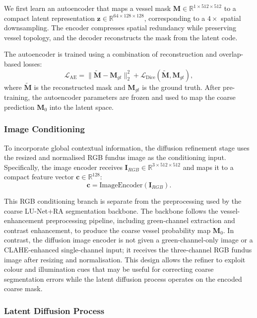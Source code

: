 \documentclass[journal,article,submit,pdftex,moreauthors]{Definitions/mdpi}
\begin{document}
We first learn an autoencoder that maps a vessel mask $\mathbf{M}\in\mathbb{R}^{1\times512\times512}$ to a compact latent representation $\mathbf{z}\in\mathbb{R}^{64\times128\times128}$, corresponding to a $4\times$ spatial downsampling. The encoder compresses spatial redundancy while preserving vessel topology, and the decoder reconstructs the mask from the latent code.

The autoencoder is trained using a combination of reconstruction and overlap-based losses:
\begin{equation}
\mathcal{L}_{\text{AE}} =
\|\tilde{\mathbf{M}}-\mathbf{M}_{gt}\|_2^2 +
\mathcal{L}_{\text{Dice}}(\tilde{\mathbf{M}},\mathbf{M}_{gt}),
\end{equation}
where $\tilde{\mathbf{M}}$ is the reconstructed mask and $\mathbf{M}_{gt}$ is the ground truth. After pre-training, the autoencoder parameters are frozen and used to map the coarse prediction $\mathbf{M}_0$ into the latent space.

\subsubsection{Image Conditioning}

To incorporate global contextual information, the diffusion refinement stage uses the resized and normalised RGB fundus image as the conditioning input. Specifically, the image encoder receives $\mathbf{I}_{RGB}\in\mathbb{R}^{3\times512\times512}$ and maps it to a compact feature vector $\mathbf{c}\in\mathbb{R}^{128}$:
\begin{equation}
\mathbf{c}=\mathrm{ImageEncoder}(\mathbf{I}_{RGB}).
\end{equation}

This RGB conditioning branch is separate from the preprocessing used by the coarse LU-Net+RA segmentation backbone. The backbone follows the vessel-enhancement preprocessing pipeline, including green-channel extraction and contrast enhancement, to produce the coarse vessel probability map $\mathbf{M}_0$. In contrast, the diffusion image encoder is not given a green-channel-only image or a CLAHE-enhanced single-channel input; it receives the three-channel RGB fundus image after resizing and normalisation. This design allows the refiner to exploit colour and illumination cues that may be useful for correcting coarse segmentation errors while the latent diffusion process operates on the encoded coarse mask.
\subsubsection{Latent Diffusion Process}
\end{document}
